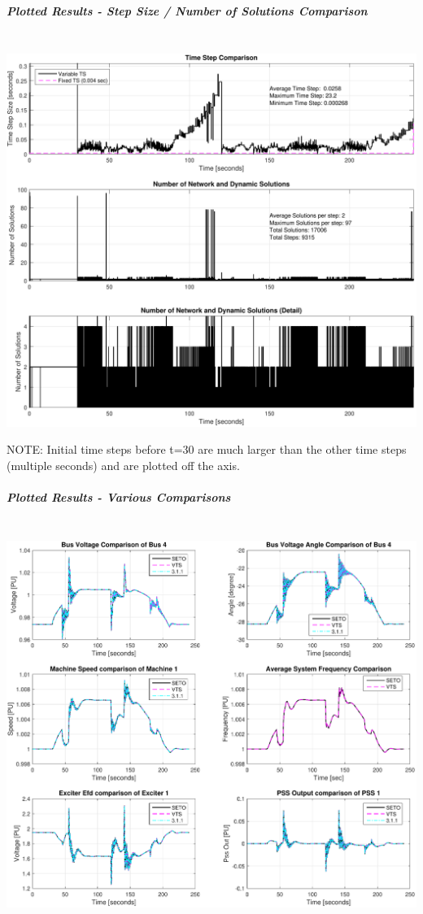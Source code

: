 \documentclass[12pt]{article}
\begin{document}
\pagebreak

 

\subparagraph{Plotted Results - Step Size / Number of Solutions Comparison} \ \\
\includegraphics[width=\linewidth]{verSteps}

NOTE: Initial time steps before t=30 are much larger than the other time steps (multiple seconds) and are plotted off the axis.

\pagebreak
\subparagraph{Plotted Results - Various Comparisons} \ \\
\includegraphics[width=\linewidth]{verComp}
\end{document}
